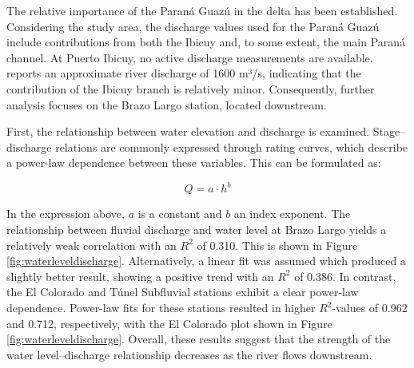 The relative importance of the Paraná Guazú in the delta has been established. Considering the study area, the discharge values used for the Paraná Guazú include contributions from both the Ibicuy and, to some extent, the main Paraná channel. At Puerto Ibicuy, no active discharge measurements are available. \textcite{brokChannelNetworkMorphodynamics2022} reports an approximate river discharge of 1600 m³/s, indicating that the contribution of the Ibicuy branch is relatively minor. Consequently, further analysis focuses on the Brazo Largo station, located downstream.

First, the relationship between water elevation and discharge is examined. Stage–discharge relations are commonly expressed through rating curves, which describe a power-law dependence between these variables. This can be formulated as:

\begin{equation}
\label{eq:powerlaw}
    Q = a \cdot h^b
\end{equation}

In the expression above, $a$ is a constant and $b$ an index exponent.
The relationship between fluvial discharge and water level at Brazo Largo yields a relatively weak correlation with an $R^2$ of 0.310. This is shown in Figure \ref{fig:waterleveldischarge}. Alternatively, a linear fit was assumed which produced a slightly better result, showing a positive trend with an $R^2$ of 0.386. In contrast, the El Colorado and Túnel Subfluvial stations exhibit a clear power-law dependence. Power-law fits for these stations resulted in higher $R^2$-values of 0.962 and 0.712, respectively, with the El Colorado plot shown in Figure \ref{fig:waterleveldischarge}. Overall, these results suggest that the strength of the water level–discharge relationship decreases as the river flows downstream.


